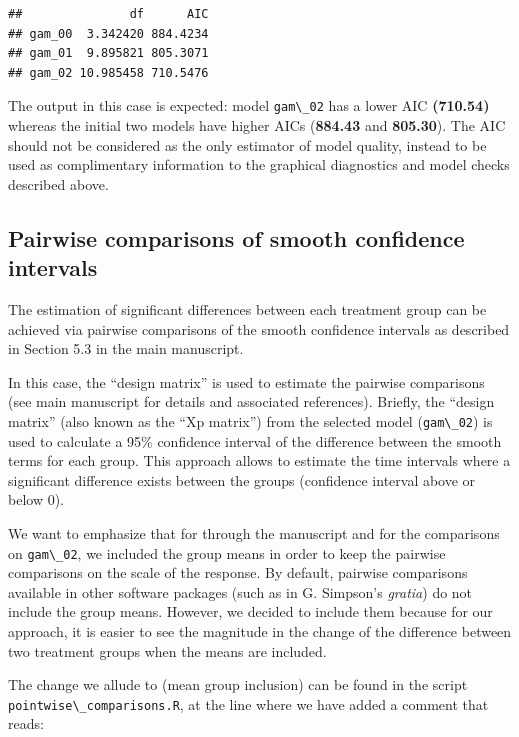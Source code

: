 \documentclass[
]{article}
\newcommand{\passthrough}[1]{#1}
\begin{document}
\begin{lstlisting}
##               df      AIC
## gam_00  3.342420 884.4234
## gam_01  9.895821 805.3071
## gam_02 10.985458 710.5476
\end{lstlisting}

The output in this case is expected: model \passthrough{\lstinline!gam\_02!} has a lower AIC \textbf{(710.54)} whereas the initial two models have higher AICs (\textbf{884.43} and \textbf{805.30}). The AIC should not be considered as the only estimator of model quality, instead to be used as complimentary information to the graphical diagnostics and model checks described above.

\hypertarget{pairwise-comparisons-of-smooth-confidence-intervals}{%
\subsection{Pairwise comparisons of smooth confidence intervals}\label{pairwise-comparisons-of-smooth-confidence-intervals}}

The estimation of significant differences between each treatment group can be achieved via pairwise comparisons of the smooth confidence intervals as described in Section 5.3 in the main manuscript.

In this case, the ``design matrix'' is used to estimate the pairwise comparisons (see main manuscript for details and associated references). Briefly, the ``design matrix'' (also known as the ``Xp matrix'') from the selected model (\passthrough{\lstinline!gam\_02!}) is used to calculate a 95\% confidence interval of the difference between the smooth terms for each group. This approach allows to estimate the time intervals where a significant difference exists between the groups (confidence interval above or below 0).

We want to emphasize that for through the manuscript and for the comparisons on \passthrough{\lstinline!gam\_02!}, we included the group means in order to keep the pairwise comparisons on the scale of the response. By default, pairwise comparisons available in other software packages (such as in G. Simpson's \emph{gratia}) do not include the group means. However, we decided to include them because for our approach, it is easier to see the magnitude in the change of the difference between two treatment groups when the means are included.

The change we allude to (mean group inclusion) can be found in the script \passthrough{\lstinline!pointwise\_comparisons.R!}, at the line where we have added a comment that reads:
\end{document}
